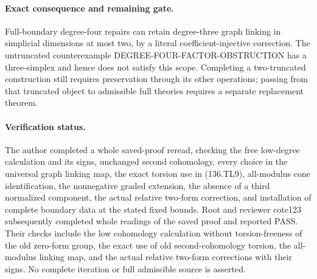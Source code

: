 \paragraph{Exact consequence and remaining gate.}
Full-boundary degree-four repairs can retain degree-three graph
linking in simplicial dimensions at most two, by a literal
coefficient-injective correction.  The untruncated counterexample
DEGREE-FOUR-FACTOR-OBSTRUCTION has a three-simplex and hence
does not satisfy this scope.  Completing a two-truncated
construction still requires preservation through its other
operations; passing from that truncated object to admissible
full theories requires a separate replacement theorem.

\paragraph{Verification status.}
The author completed a whole saved-proof reread, checking the
free low-degree calculation and its signs, unchanged second
cohomology, every choice in the universal graph linking map,
the exact torsion use in (136.TL9), all-modulus cone identification,
the nonnegative graded extension, the absence of a third
normalized component, the actual relative two-form correction,
and installation of complete boundary data at the stated fixed
bounds.  Root and reviewer cote123 subsequently completed whole
readings of the saved proof and reported PASS.  Their checks
include the low cohomology calculation without torsion-freeness
of the old zero-form group, the exact use of old second-cohomology
torsion, the all-modulus linking map, and the actual relative
two-form corrections with their signs.  No complete iteration
or full admissible source is asserted.
